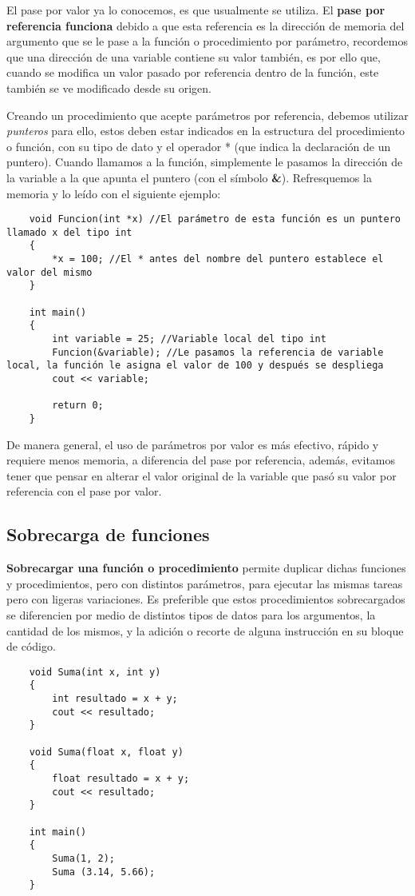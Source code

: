 El pase por valor ya lo conocemos, es que usualmente se utiliza. El \textbf{pase por referencia funciona} debido a que esta referencia es la dirección de memoria del argumento que se le pase a la función o procedimiento por parámetro, recordemos que una dirección de una variable contiene su valor también, es por ello que, cuando se modifica un valor pasado por referencia dentro de la función, este también se ve modificado desde su origen.

Creando un procedimiento que acepte parámetros por referencia, debemos utilizar \textit{punteros} para ello, estos deben estar indicados en la estructura del procedimiento o función, con su tipo de dato y el operador * (que indica la declaración de un puntero). Cuando llamamos a la función, simplemente le pasamos la dirección de la variable a la que apunta el puntero (con el símbolo \textbf{\&}). Refresquemos la memoria y lo leído con el siguiente ejemplo:
\begin{lstlisting}
    void Funcion(int *x) //El parámetro de esta función es un puntero llamado x del tipo int
    {
        *x = 100; //El * antes del nombre del puntero establece el valor del mismo
    }
    
    int main()
    {
        int variable = 25; //Variable local del tipo int
        Funcion(&variable); //Le pasamos la referencia de variable local, la función le asigna el valor de 100 y después se despliega
        cout << variable;
    
        return 0;
    }
\end{lstlisting}

De manera general, el uso de parámetros por valor es más efectivo, rápido y requiere menos memoria, a diferencia del pase por referencia, además, evitamos tener que pensar en alterar el valor original de la variable que pasó su valor por referencia con el pase por valor.


\subsection{Sobrecarga de funciones}
\hspace{0.55cm}\textbf{Sobrecargar una función o procedimiento} permite duplicar dichas funciones y procedimientos, pero con distintos parámetros, para ejecutar las mismas tareas pero con ligeras variaciones. Es preferible que estos procedimientos sobrecargados se diferencien por medio de distintos tipos de datos para los argumentos, la cantidad de los mismos, y la adición o recorte de alguna instrucción en su bloque de código.
\begin{lstlisting}
    void Suma(int x, int y)
    {
        int resultado = x + y;
        cout << resultado;
    }
    
    void Suma(float x, float y)
    {
        float resultado = x + y;
        cout << resultado;
    }

    int main()
    {
        Suma(1, 2);
        Suma (3.14, 5.66);
    }
\end{lstlisting}

